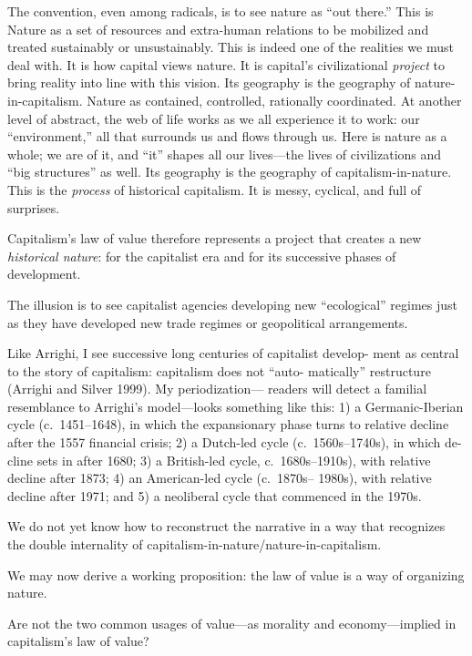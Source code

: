 \documentclass[
]{book}
\begin{document}
The convention, even among radicals, is to see nature as
``out there.'' This is Nature as a set of resources and extra-human
relations to be mobilized and treated sustainably or unsustainably. This
is indeed one of the realities we must deal with. It is how capital views
nature. It is capital's civilizational \emph{project} to bring reality into line with
this vision. Its geography is the geography of nature-in-capitalism.
Nature as contained, controlled, rationally coordinated. At another
level of abstract, the web of life works as we all experience it to work:
our ``environment,'' all that surrounds us and flows through us. Here
is nature as a whole; we are of it, and ``it'' shapes all our lives---the
lives of civilizations and ``big structures'' as well. Its geography is the
geography of capitalism-in-nature. This is the \emph{process} of historical
capitalism. It is messy, cyclical, and full of surprises.

Capitalism's law of value therefore represents a project that creates
a new \emph{historical nature}: for the capitalist era and for its successive
phases of development.

The illusion is to see capitalist agencies developing new
``ecological'' regimes just as they have developed new trade regimes or
geopolitical arrangements.

Like Arrighi, I see successive long centuries of capitalist develop-
ment as central to the story of capitalism: capitalism does not ``auto-
matically'' restructure (Arrighi and Silver 1999). My periodization---
readers will detect a familial resemblance to Arrighi's model---looks
something like this: 1) a Germanic-Iberian cycle (c.~1451--1648), in
which the expansionary phase turns to relative decline after the 1557
financial crisis; 2) a Dutch-led cycle (c.~1560s--1740s), in which de-
cline sets in after 1680; 3) a British-led cycle, c.~1680s--1910s), with
relative decline after 1873; 4) an American-led cycle (c.~1870s--
1980s), with relative decline after 1971; and 5) a neoliberal cycle that
commenced in the 1970s.

We do not yet know
how to reconstruct the narrative in a way that recognizes the double
internality of capitalism-in-nature/nature-in-capitalism.

We may now derive a working proposition: the law of value is a
way of organizing nature.

Are not the two common
usages of value---as morality and economy---implied in capitalism's
law of value?
\end{document}
